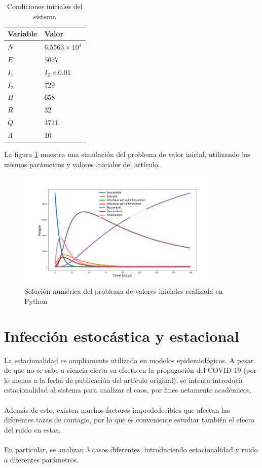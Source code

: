 \documentclass[conference]{IEEEtran}
\begin{document}
\begin{table}[h]
    \centering
    \begin{tabular}{ll}
    \hline
    Variable  & Valor                  \\ \hline
    $N$       & $6.5563 \times 10 ^ 4$ \\ 
    $E$       & $5077$                 \\ 
    $I_1$     & $I_2 \times 0.01$      \\ 
    $I_2$     & $729$                  \\ 
    $H$       & $658$                  \\ 
    $R$       & $32$                   \\ 
    $Q$       & $4711$                 \\ 
    $\Lambda$ & $10$                   \\ \hline
    \end{tabular}
    \caption{Condiciones iniciales del sistema}
    \label{ic1}
\end{table}
La figura \ref{pvi_1} muestra una simulación del problema de valor inicial, utilizando
los mismos parámetros y valores iniciales del artículo. 

\begin{figure}[h]
    \centering
    \includegraphics[width=10cm]{../Figures/ivp_1.png}
    \caption{Solución numérica del problema de valores iniciales realizada en Python}
    \label{pvi_1}
\end{figure}

\section{Infección estocástica y estacional}

La estacionalidad es ampliamente utilizada en modelos epidemiológicos. A pesar de que no se sabe
a ciencia cierta su efecto en la propagación del COVID-19 (por lo menos a la fecha
de publicación del artículo original), se intenta introducir estacionalidad al sistema para analizar el caos, 
por fines netamente académicos.
\\\\
Además de esto, existen muchos factores imprededecibles que afectan las diferentes tazas de contagio,
por lo que es conveniente estudiar también el efecto del ruido en estas.
\\\\
En particular, se analizan 3 casos diferentes, introduciendo estacionalidad y ruido a diferentes parámetros.
\\\\
\end{document}
